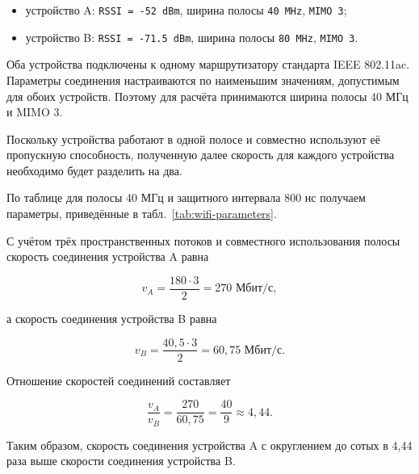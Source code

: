 \begin{itemize}
	\item устройство A: \texttt{RSSI = -52 dBm}, ширина полосы
	\texttt{40 MHz}, \texttt{MIMO 3};
	\item устройство B: \texttt{RSSI = -71.5 dBm}, ширина полосы
	\texttt{80 MHz}, \texttt{MIMO 3}.
\end{itemize}

Оба устройства подключены к одному маршрутизатору стандарта IEEE 802.11ac.
Параметры соединения настраиваются по наименьшим значениям, допустимым
для обоих устройств. Поэтому для расчёта принимаются ширина полосы
40 МГц и MIMO 3.

Поскольку устройства работают в одной
полосе и совместно используют её пропускную способность, полученную далее скорость для
каждого устройства необходимо будет разделить на два.

По таблице для полосы 40 МГц и защитного интервала 800 нс получаем параметры,
приведённые в табл.~\ref{tab:wifi-parameters}.

\begin{table}[H]
	\centering
	\caption{Параметры соединения устройств для полосы 40 МГц}
	\label{tab:wifi-parameters}
\end{table}

С учётом трёх пространственных потоков и совместного использования полосы
скорость соединения устройства A равна

\[
	v_A = \frac{180 \cdot 3}{2} = 270\text{ Мбит/с},
\]

а скорость соединения устройства B равна

\[
	v_B = \frac{40{,}5 \cdot 3}{2} = 60{,}75\text{ Мбит/с}.
\]

Отношение скоростей соединений составляет

\[
	\frac{v_A}{v_B} = \frac{270}{60{,}75}
	= \frac{40}{9} \approx 4{,}44.
\]

Таким образом, скорость соединения устройства A с округлением до сотых в 4,44 раза
выше скорости соединения устройства B.

